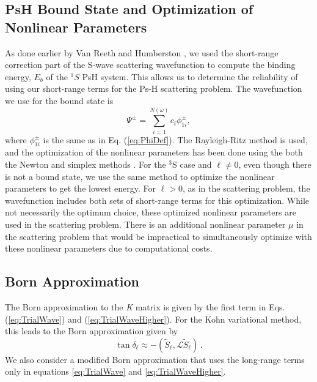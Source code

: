 \documentclass[preprint,showpacs,preprintnumbers,amsmath,amssymb,longbibliography,pra,aps]{revtex4-1}
\begin{document}

\subsection{PsH Bound State and Optimization of Nonlinear Parameters}
As done earlier by Van Reeth and Humberston \cite{VanReeth2003,VanReeth2004}, we used the short-range correction part of the S-wave scattering wavefunction to compute the binding energy, $E_b$ of the $^1S$ PsH system. This allows us to determine the reliability of using our short-range terms for the Ps-H scattering problem. The wavefunction we use for the bound state is
\begin{equation}
\label{eq:BoundWavefn}
\Psi^\pm = \sum_{i=1}^{N(\omega)} c_i \phi_{1i}^\pm,
\end{equation}
where $\phi_{1i}^\pm$ is the same as in Eq. (\ref{eq:PhiDef}). The Rayleigh-Ritz method is used, and the optimization of the nonlinear parameters has been done using the both the Newton and simplex methods \cite{Yan1999,GSL}. For the $^3$S case and $\ell \neq 0$, even though there is not a bound state, we use the same method to optimize the nonlinear parameters to get the lowest energy. For $\ell > 0$, as in the scattering problem, the wavefunction includes both sets of short-range terms for this optimization. While not necessarily the optimum choice, these optimized nonlinear parameters are used in the scattering problem. There is an additional nonlinear parameter $\mu$ in the scattering problem that would be impractical to simultaneously optimize with these nonlinear parameters due to computational costs.

\subsection{Born Approximation}
The Born approximation to the \emph{K} matrix \cite{Bransden2003} is given by the first term in Eqs. (\ref{eq:TrialWave}) and (\ref{eq:TrialWaveHigher}). For the Kohn variational method, this leads to the Born approximation given by
\begin{equation}
\label{eq:Born}
\tan\delta_\ell \approx -(\widetilde{S}_\ell,\mathcal{L}\widetilde{S}_\ell )\, .
\end{equation}
We also consider a modified Born approximation that uses the long-range terms only in equations \ref{eq:TrialWave} and \ref{eq:TrialWaveHigher}.
\end{document}
